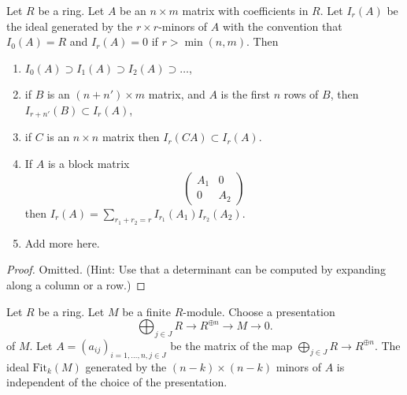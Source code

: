 \begin{lemma}
\label{lemma-ideals-generated-by-minors}
Let $R$ be a ring. Let $A$ be an $n \times m$ matrix with coefficients
in $R$. Let $I_r(A)$ be the ideal generated by the $r \times r$-minors
of $A$ with the convention that $I_0(A) = R$ and $I_r(A) = 0$ if
$r > \min(n, m)$. Then
\begin{enumerate}
\item $I_0(A) \supset I_1(A) \supset I_2(A) \supset \ldots$,
\item if $B$ is an $(n + n') \times m$ matrix, and $A$ is the first
$n$ rows of $B$, then $I_{r + n'}(B) \subset I_r(A)$,
\item if $C$ is an $n \times n$ matrix then $I_r(CA) \subset I_r(A)$.
\item If $A$ is a block matrix
$$
\left(
\begin{matrix}
A_1 & 0 \\
0 & A_2 
\end{matrix}
\right)
$$
then $I_r(A) = \sum_{r_1 + r_2 = r} I_{r_1}(A_1) I_{r_2}(A_2)$.
\item Add more here.
\end{enumerate}
\end{lemma}

\begin{proof}
Omitted. (Hint: Use that a determinant can be computed by expanding
along a column or a row.)
\end{proof}

\begin{lemma}
\label{lemma-fitting-ideal}
Let $R$ be a ring. Let $M$ be a finite $R$-module. Choose a presentation
$$
\bigoplus\nolimits_{j \in J} R \longrightarrow R^{\oplus n}
\longrightarrow M \longrightarrow 0.
$$
of $M$. Let $A = (a_{ij})_{i = 1, \ldots, n, j \in J}$ be the matrix
of the map $\bigoplus_{j \in J} R \to R^{\oplus n}$.
The ideal $\text{Fit}_k(M)$ generated by the
$(n - k) \times (n - k)$ minors of
$A$ is independent of the choice of the presentation.
\end{lemma}

